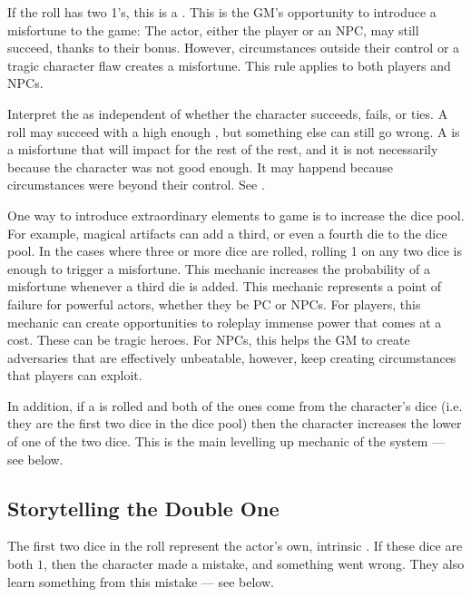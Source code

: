 If the roll has two 1's, this is a .
This is the GM's opportunity to introduce a misfortune to the game:
The actor, either the player or an NPC, may still succeed, thanks to their bonus.
However, circumstances outside their control or a tragic character flaw creates a misfortune.
This rule applies to both players and NPCs.

Interpret the  as independent of whether the character
succeeds, fails, or ties. A roll may succeed with a high enough ,
but something else can still go wrong. A  is a misfortune that will
impact for the rest of the rest, and it is not necessarily
because the character was not good enough. It may happend because circumstances were
beyond their control. See .

One way to introduce extraordinary elements to game is to increase the dice pool.
For example, magical artifacts can add a third, or even a fourth die to the dice pool.
In the cases where three or more dice are rolled,
rolling 1 on any two dice is enough to trigger a misfortune.
This mechanic increases the probability of a misfortune
whenever a third die is added. This mechanic represents
a point of failure for powerful actors, whether they be
PC or NPCs. For players, this mechanic can create
opportunities to roleplay immense power that comes at a cost.
These can be tragic heroes. For NPCs, this helps the GM
to create adversaries that are effectively unbeatable,
however, keep creating circumstances that players can exploit.

In addition, if a  is rolled and both of the ones
come from the character's  dice (i.e. they are the first
two dice in the dice pool) then the character increases the lower of
one of the two  dice. This is the main levelling up mechanic of
the system --- see  below.

\subsection{Storytelling the Double One}
\label{subsec:storytelling_the_double_one}

The first two dice in the roll represent the actor's own, intrinsic .
If these dice are both $1$, then the character made a mistake, and something went wrong.
They also learn something from this mistake --- see  below.

